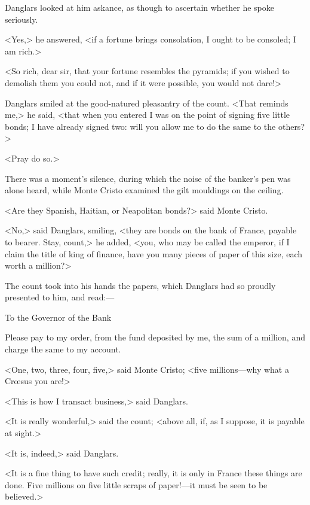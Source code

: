  Danglars looked at him askance, as though to ascertain whether he spoke seriously. 

 <Yes,> he answered, <if a fortune brings consolation, I ought to be consoled; I am rich.> 

 <So rich, dear sir, that your fortune resembles the pyramids; if you wished to demolish them you could not, and if it were possible, you would not dare!> 

 Danglars smiled at the good-natured pleasantry of the count. <That reminds me,> he said, <that when you entered I was on the point of signing five little bonds; I have already signed two: will you allow me to do the same to the others?> 

 <Pray do so.> 

 There was a moment's silence, during which the noise of the banker's pen was alone heard, while Monte Cristo examined the gilt mouldings on the ceiling. 

 <Are they Spanish, Haitian, or Neapolitan bonds?> said Monte Cristo. 

 <No,> said Danglars, smiling, <they are bonds on the bank of France, payable to bearer. Stay, count,> he added, <you, who may be called the emperor, if I claim the title of king of finance, have you many pieces of paper of this size, each worth a million?> 

 The count took into his hands the papers, which Danglars had so proudly presented to him, and read:— 

\begin{mail}{}{To the Governor of the Bank}
	
Please pay to my order, from the fund deposited by me, the sum of a million, and charge the same to my account. 

\end{mail}

 <One, two, three, four, five,> said Monte Cristo; <five millions—why what a Crœsus you are!> 

 <This is how I transact business,> said Danglars. 

 <It is really wonderful,> said the count; <above all, if, as I suppose, it is payable at sight.> 

 <It is, indeed,> said Danglars. 

 <It is a fine thing to have such credit; really, it is only in France these things are done. Five millions on five little scraps of paper!—it must be seen to be believed.> 

